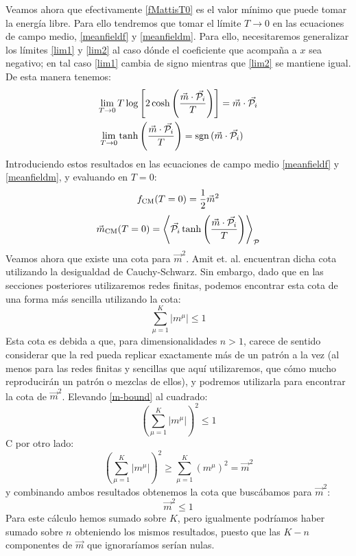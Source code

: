 \documentclass[titlepage,12pt]{article}
\numberwithin{equation}{section}
\begin{document}
	Veamos ahora que efectivamente \eqref{fMattisT0} es el valor mínimo que puede tomar la energía libre. Para ello tendremos que tomar el límite $T\rightarrow0$ en las ecuaciones de campo medio, \eqref{meanfieldf} y \eqref{meanfieldm}. Para ello, necesitaremos generalizar los límites \eqref{lim1} y \eqref{lim2} al caso dónde el coeficiente que acompaña a $x$ sea negativo; en tal caso \eqref{lim1} cambia de signo mientras que \eqref{lim2} se mantiene igual. De esta manera tenemos:
	\begin{align*}
	\lim_{T\rightarrow0}T\log&\left[2\cosh\left(\frac{\vec{m}\cdot\vec{\mathcal{P}_i}}{T}\right)\right]=\vec{m}\cdot\vec{\mathcal{P}_i} \\
	\lim_{T\rightarrow0}\tanh&\left(\frac{\vec{m}\cdot\vec{\mathcal{P}_i}}{T}\right)=\textnormal{sgn}\,(\vec{m}\cdot\vec{\mathcal{P}_i})
	\end{align*}
	Introduciendo estos resultados en las ecuaciones de campo medio \eqref{meanfieldf} y \eqref{meanfieldm}, y evaluando en $T=0$:
	\begin{equation}
	f_{\textnormal{CM}}(T=0)=\frac{1}{2}\vec{m}^2
	\label{fgs}
	\end{equation}
	\begin{equation}
	\vec{m}_{\textnormal{CM}}(T=0)=\left<\vec{\mathcal{P}_i}\tanh\left(\frac{\vec{m}\cdot\vec{\mathcal{P}_i}}{T}\right)\right>_{\mathcal{P}}
	\label{mgs}
	\end{equation}
	Veamos ahora que existe una cota para $\vec{m}^2$. Amit et. al. \cite{amit1} encuentran dicha cota utilizando la desigualdad de Cauchy-Schwarz. Sin embargo, dado que en las secciones posteriores utilizaremos redes finitas, podemos encontrar esta cota de una forma más sencilla utilizando la cota:
	\begin{equation}
	\sum_{\mu=1}^K |m^\mu|\leq 1
	\label{m-bound}
	\end{equation}
	Esta cota es debida a que, para dimensionalidades $n>1$, carece de sentido considerar que la red pueda replicar exactamente más de un patrón a la vez (al menos para las redes finitas y sencillas que aquí utilizaremos, que cómo mucho reproducirán un patrón o mezclas de ellos), y podremos utilizarla para encontrar la cota de $\vec{m}^2$. Elevando \eqref{m-bound} al cuadrado: 
	\begin{displaymath}
	\left(\sum_{\mu=1}^K |m^\mu|\right)^2\leq 1
	\end{displaymath}C
	por otro lado:
	\begin{displaymath}
	\left(\sum_{\mu=1}^K |m^\mu|\right)^2\geq\sum_{\mu=1}^K (m^\mu)^2=\vec{m}^2
	\end{displaymath}
	y combinando ambos resultados obtenemos la cota que buscábamos para $\vec{m}^2$:
	\begin{displaymath}
	\vec{m}^2\leq 1
	\end{displaymath}
	Para este cálculo hemos sumado sobre $K$, pero igualmente podríamos haber sumado sobre $n$ obteniendo los mismos resultados, puesto que las $K-n$ componentes de $\vec{m}$ que ignoraríamos serían nulas.
	\\
	
\end{document}
